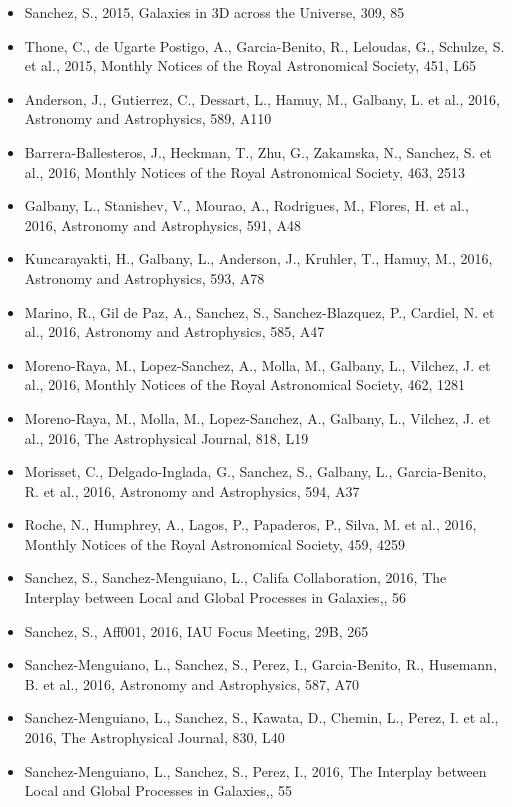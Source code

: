 \documentclass{letter}
\begin{document}
\begin{enumerate}
\begin{itemize}
\item Sanchez, S., 2015, Galaxies in 3D across the Universe, 309, 85
\item Thone, C., de Ugarte Postigo, A., Garcia-Benito, R., Leloudas, G., Schulze, S. et al., 2015, Monthly Notices of the Royal Astronomical Society, 451, L65
\item Anderson, J., Gutierrez, C., Dessart, L., Hamuy, M., Galbany, L. et al., 2016, Astronomy and Astrophysics, 589, A110
\item Barrera-Ballesteros, J., Heckman, T., Zhu, G., Zakamska, N., Sanchez, S. et al., 2016, Monthly Notices of the Royal Astronomical Society, 463, 2513
\item Galbany, L., Stanishev, V., Mourao, A., Rodrigues, M., Flores, H. et al., 2016, Astronomy and Astrophysics, 591, A48
\item Kuncarayakti, H., Galbany, L., Anderson, J., Kruhler, T., Hamuy, M., 2016, Astronomy and Astrophysics, 593, A78
\item Marino, R., Gil de Paz, A., Sanchez, S., Sanchez-Blazquez, P., Cardiel, N. et al., 2016, Astronomy and Astrophysics, 585, A47
\item Moreno-Raya, M., Lopez-Sanchez, A., Molla, M., Galbany, L., Vilchez, J. et al., 2016, Monthly Notices of the Royal Astronomical Society, 462, 1281
\item Moreno-Raya, M., Molla, M., Lopez-Sanchez, A., Galbany, L., Vilchez, J. et al., 2016, The Astrophysical Journal, 818, L19
\item Morisset, C., Delgado-Inglada, G., Sanchez, S., Galbany, L., Garcia-Benito, R. et al., 2016, Astronomy and Astrophysics, 594, A37
\item Roche, N., Humphrey, A., Lagos, P., Papaderos, P., Silva, M. et al., 2016, Monthly Notices of the Royal Astronomical Society, 459, 4259
\item Sanchez, S., Sanchez-Menguiano, L., Califa Collaboration, 2016, The Interplay between Local and Global Processes in Galaxies,, 56
\item Sanchez, S., Aff001, 2016, IAU Focus Meeting, 29B, 265
\item Sanchez-Menguiano, L., Sanchez, S., Perez, I., Garcia-Benito, R., Husemann, B. et al., 2016, Astronomy and Astrophysics, 587, A70
\item Sanchez-Menguiano, L., Sanchez, S., Kawata, D., Chemin, L., Perez, I. et al., 2016, The Astrophysical Journal, 830, L40
\item Sanchez-Menguiano, L., Sanchez, S., Perez, I., 2016, The Interplay between Local and Global Processes in Galaxies,, 55

\end{itemize}
\end{enumerate}
\end{document}
